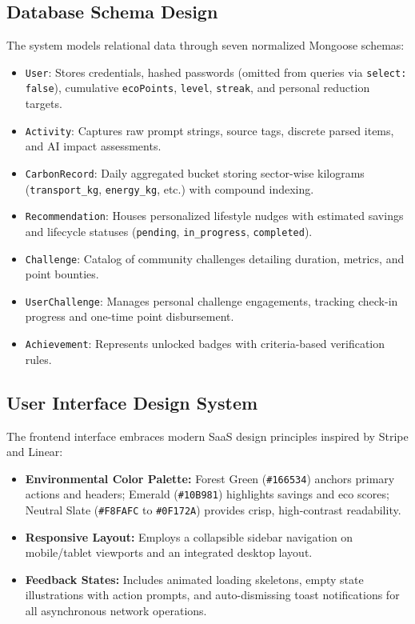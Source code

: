 \documentclass[12pt,a4paper]{article}
\begin{document}
\subsection{Database Schema Design}
The system models relational data through seven normalized Mongoose schemas:
\begin{itemize}
    \item \texttt{User}: Stores credentials, hashed passwords (omitted from queries via \texttt{select: false}), cumulative \texttt{ecoPoints}, \texttt{level}, \texttt{streak}, and personal reduction targets.
    \item \texttt{Activity}: Captures raw prompt strings, source tags, discrete parsed items, and AI impact assessments.
    \item \texttt{CarbonRecord}: Daily aggregated bucket storing sector-wise kilograms (\texttt{transport\_kg}, \texttt{energy\_kg}, etc.) with compound indexing.
    \item \texttt{Recommendation}: Houses personalized lifestyle nudges with estimated savings and lifecycle statuses (\texttt{pending}, \texttt{in\_progress}, \texttt{completed}).
    \item \texttt{Challenge}: Catalog of community challenges detailing duration, metrics, and point bounties.
    \item \texttt{UserChallenge}: Manages personal challenge engagements, tracking check-in progress and one-time point disbursement.
    \item \texttt{Achievement}: Represents unlocked badges with criteria-based verification rules.
\end{itemize}

\subsection{User Interface Design System}
The frontend interface embraces modern SaaS design principles inspired by Stripe and Linear:
\begin{itemize}
    \item \textbf{Environmental Color Palette:} Forest Green (\texttt{\#166534}) anchors primary actions and headers; Emerald (\texttt{\#10B981}) highlights savings and eco scores; Neutral Slate (\texttt{\#F8FAFC} to \texttt{\#0F172A}) provides crisp, high-contrast readability.
    \item \textbf{Responsive Layout:} Employs a collapsible sidebar navigation on mobile/tablet viewports and an integrated desktop layout.
    \item \textbf{Feedback States:} Includes animated loading skeletons, empty state illustrations with action prompts, and auto-dismissing toast notifications for all asynchronous network operations.
\end{itemize}
\end{document}
